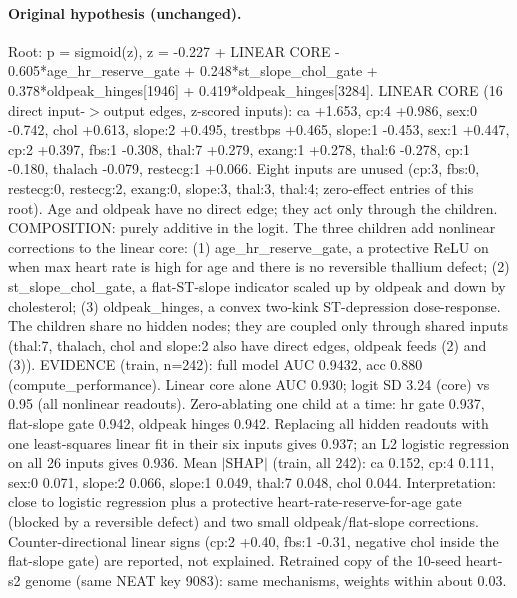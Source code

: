 \documentclass[a4paper,10pt]{article}
\newif\ifreviewmarks
\newcommand{\reviewrule}{\noindent{\color{BrickRed}\rule{\linewidth}{0.8pt}}}
\newenvironment{drafted}[1][]{%
  \ifreviewmarks\par\addvspace{\medskipamount}\reviewrule\par\nopagebreak
  \noindent{\color{BrickRed}\sffamily\footnotesize\textbf{Thesis Draft}\quad #1\hfill review}\par\nopagebreak\smallskip\fi}{%
  \ifreviewmarks\par\smallskip\noindent{\color{BrickRed}\sffamily\footnotesize end of thesis draft}\par\nopagebreak\reviewrule\par\medskip\fi}
\begin{document}
\begin{drafted}[plain-language layer: heart-s2-c1]
\paragraph{Original hypothesis (unchanged).} Root: p = sigmoid(z), z = -0.227 + LINEAR CORE - 0.605*\allowbreak{}age\_\allowbreak{}hr\_\allowbreak{}reserve\_\allowbreak{}gate + 0.248*\allowbreak{}st\_\allowbreak{}slope\_\allowbreak{}chol\_\allowbreak{}gate + 0.378*\allowbreak{}oldpeak\_\allowbreak{}hinges[1946]\allowbreak{} + 0.419*\allowbreak{}oldpeak\_\allowbreak{}hinges[3284]\allowbreak{}. LINEAR CORE (16 direct input-$>$output edges, z-scored inputs): ca +1.653, cp:4 +0.986, sex:0 -0.742, chol +0.613, slope:2 +0.495, trestbps +0.465, slope:1 -0.453, sex:1 +0.447, cp:2 +0.397, fbs:1 -0.308, thal:7 +0.279, exang:1 +0.278, thal:6 -0.278, cp:1 -0.180, thalach -0.079, restecg:1 +0.066. Eight inputs are unused (cp:3, fbs:0, restecg:0, restecg:2, exang:0, slope:3, thal:3, thal:4; zero-effect entries of this root). Age and oldpeak have no direct edge; they act only through the children. COMPOSITION: purely additive in the logit. The three children add nonlinear corrections to the linear core: (1) age\_\allowbreak{}hr\_\allowbreak{}reserve\_\allowbreak{}gate, a protective ReLU on when max heart rate is high for age and there is no reversible thallium defect; (2) st\_\allowbreak{}slope\_\allowbreak{}chol\_\allowbreak{}gate, a flat-ST-slope indicator scaled up by oldpeak and down by cholesterol; (3) oldpeak\_\allowbreak{}hinges, a convex two-kink ST-depression dose-response. The children share no hidden nodes; they are coupled only through shared inputs (thal:7, thalach, chol and slope:2 also have direct edges, oldpeak feeds (2) and (3)). EVIDENCE (train, n=242): full model AUC 0.9432, acc 0.880 (compute\_\allowbreak{}performance)\allowbreak{}. Linear core alone AUC 0.930; logit SD 3.24 (core) vs 0.95 (all nonlinear readouts). Zero-ablating one child at a time: hr gate 0.937, flat-slope gate 0.942, oldpeak hinges 0.942. Replacing all hidden readouts with one least-squares linear fit in their six inputs gives 0.937; an L2 logistic regression on all 26 inputs gives 0.936. Mean $|$SHAP$|$ (train, all 242): ca 0.152, cp:4 0.111, sex:0 0.071, slope:2 0.066, slope:1 0.049, thal:7 0.048, chol 0.044. Interpretation: close to logistic regression plus a protective heart-rate-reserve-for-age gate (blocked by a reversible defect) and two small oldpeak/flat-slope corrections. Counter-directional linear signs (cp:2 +0.40, fbs:1 -0.31, negative chol inside the flat-slope gate) are reported, not explained. Retrained copy of the 10-seed heart-s2 genome (same NEAT key 9083): same mechanisms, weights within about 0.03.

\end{drafted}
\end{document}
